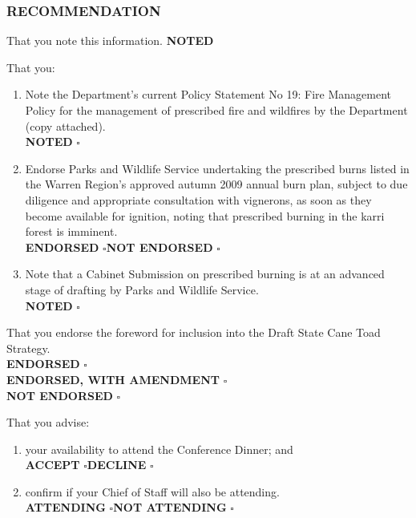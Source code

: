 {{{{{{{{{{{{{\subsubsection{RECOMMENDATION}
{%
\normalsize That you note this information. \hfill \textbf{NOTED} \Huge\square
{%
\normalsize That you:
\begin{enumerate} \itemsep -0pt
\item Note the Department’s current Policy Statement No 19: Fire Management Policy for the management of prescribed fire and wildfires by the Department (copy attached). \\ \hspace*{65mm} \textbf{NOTED} \Huge$\square$\normalsize

\item Endorse Parks and Wildlife Service undertaking the prescribed burns listed in the Warren Region’s approved autumn 2009 annual burn plan, subject to due diligence and appropriate consultation with vignerons, as soon as they become available for ignition, noting that prescribed burning in the karri forest is imminent. \\ \hspace*{65mm} \textbf{ENDORSED} \Huge$\square$\normalsize \textbf{NOT ENDORSED} \Huge$\square$\normalsize

\item Note that a Cabinet Submission on prescribed burning is at an advanced stage of drafting by Parks and Wildlife Service. \\ \hspace*{65mm} \textbf{NOTED} \Huge$\square$\normalsize

\end{enumerate}
{%
\normalsize That you endorse the foreword for inclusion into the Draft State Cane Toad Strategy.
\\ \hspace*{65mm} \textbf{ENDORSED} \Huge$\square$\normalsize
\\ \hspace*{65mm} \textbf{ENDORSED, WITH AMENDMENT} \Huge$\square$\normalsize
\\ \hspace*{65mm} \textbf{NOT ENDORSED} \Huge$\square$\normalsize

{%
\normalsize That you advise:
\begin{enumerate}
\item your availability to attend the Conference Dinner; and \\ \hspace*{65mm} \textbf{ACCEPT} \Huge$\square$\normalsize \textbf{DECLINE} \Huge$\square$\normalsize
\item confirm if your Chief of Staff will also be attending. \\ \hspace*{65mm} \textbf{ATTENDING} \Huge$\square$\normalsize \textbf{NOT ATTENDING} \Huge$\square$\normalsize
\end{enumerate}
{%

}}}}}}}}}}}}}}}}}}
